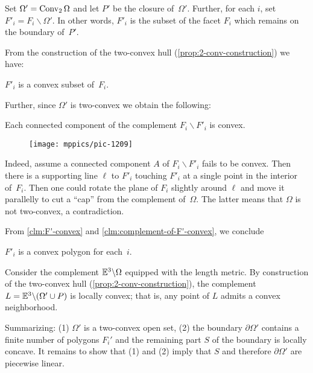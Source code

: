 Set $\Omega'=\mathop{\rm Conv}\nolimits_2\Omega$ and let $P'$ be the closure of~$\Omega'$.
Further, 
for each $i$, 
set $F'_i=F_i\backslash \Omega'$.
In other words, 
$F'_i$ is the subset of the facet $F_i$ 
which remains on the boundary of~$P'$.

From the construction of the two-convex hull (\ref{prop:2-conv-construction}) we have:

\begin{clm}{}\label{clm:F'-convex}
$F'_i$ is  a convex subset of~$F_i$.
\end{clm}

Further, since $\Omega'$ is two-convex we obtain the following:

\begin{clm}{}\label{clm:complement-of-F'-convex}
Each connected component of the complement $F_i\backslash F'_i$ is convex.
\end{clm}

{

\begin{wrapfigure}{r}{20mm}
\vskip-0mm
\centering
\texttt{[image: mppics/pic-1209]}
\end{wrapfigure}

Indeed, assume a connected component $A$ of $F_i\backslash F'_i$ fails to be convex.
Then there is a supporting line $\ell$ to $F'_i$ touching $F'_i$ at a single point in the interior of~$F_i$.
Then one could rotate the plane of $F_i$ slightly around $\ell$ and move it parallelly to cut a ``cap'' from the complement of~$\Omega$.  
The latter means that $\Omega$ is not two-convex, 
a contradiction.
\claimqeds

}

From \ref{clm:F'-convex} and \ref{clm:complement-of-F'-convex}, we conclude
\begin{clm}{}$F'_i$ is a convex polygon for each~$i$.
\end{clm}

Consider the complement 
$\mathbb{E}^3\backslash \Omega$ 
equipped with the length metric.
By construction of the two-convex hull (\ref{prop:2-conv-construction}), 
the complement $L\z=\EE^3\backslash (\Omega'\cup P)$
is locally convex;
that is, any point of $L$ admits a convex neighborhood.

Summarizing: (1)
$\Omega'$ is a two-convex open set,
(2) the boundary $\partial\Omega'$ 
contains a finite number of polygons $F_i'$
and the remaining part $S$ of the boundary is locally concave.
It remains to show that (1) and (2) imply that $S$ and therefore $\partial\Omega'$
are piecewise linear.

